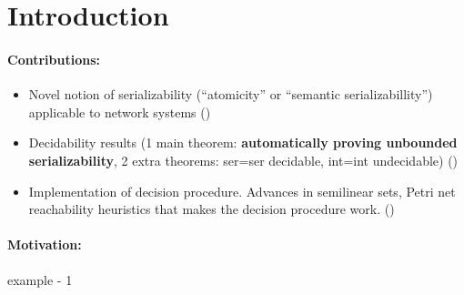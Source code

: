 \section{Introduction}
\label{sec:introduction}






\paragraph{Contributions:}
\begin{itemize}
    \item Novel notion of serializability (``atomicity'' or ``semantic serializabillity'') applicable to network systems ()
    \item Decidability results (1 main theorem: \textbf{automatically proving unbounded serializability}, 2 extra theorems: ser=ser decidable, int=int undecidable) ()
    \item Implementation of decision procedure. Advances in semilinear sets, Petri net reachability heuristics that makes the decision procedure work. ()
\end{itemize}

\newpage


\paragraph{Motivation:}

example - 1

	
	
